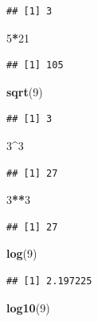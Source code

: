 \documentclass[
]{book}
\newenvironment{Shaded}{\begin{snugshade}}{\end{snugshade}}
\newcommand{\DecValTok}[1]{\textcolor[rgb]{0.00,0.00,0.81}{#1}}
\newcommand{\FunctionTok}[1]{\textcolor[rgb]{0.13,0.29,0.53}{\textbf{#1}}}
\newcommand{\NormalTok}[1]{#1}
\newcommand{\SpecialCharTok}[1]{\textcolor[rgb]{0.81,0.36,0.00}{\textbf{#1}}}
\begin{document}
\begin{verbatim}
## [1] 3
\end{verbatim}

\begin{Shaded}
\begin{Highlighting}[]
\DecValTok{5}\SpecialCharTok{*}\DecValTok{21}
\end{Highlighting}
\end{Shaded}

\begin{verbatim}
## [1] 105
\end{verbatim}

\begin{Shaded}
\begin{Highlighting}[]
\FunctionTok{sqrt}\NormalTok{(}\DecValTok{9}\NormalTok{)}
\end{Highlighting}
\end{Shaded}

\begin{verbatim}
## [1] 3
\end{verbatim}

\begin{Shaded}
\begin{Highlighting}[]
\DecValTok{3}\SpecialCharTok{\^{}}\DecValTok{3}
\end{Highlighting}
\end{Shaded}

\begin{verbatim}
## [1] 27
\end{verbatim}

\begin{Shaded}
\begin{Highlighting}[]
\DecValTok{3}\SpecialCharTok{**}\DecValTok{3}
\end{Highlighting}
\end{Shaded}

\begin{verbatim}
## [1] 27
\end{verbatim}

\begin{Shaded}
\begin{Highlighting}[]
\FunctionTok{log}\NormalTok{(}\DecValTok{9}\NormalTok{)}
\end{Highlighting}
\end{Shaded}

\begin{verbatim}
## [1] 2.197225
\end{verbatim}

\begin{Shaded}
\begin{Highlighting}[]
\FunctionTok{log10}\NormalTok{(}\DecValTok{9}\NormalTok{)}
\end{Highlighting}
\end{Shaded}
\end{document}
